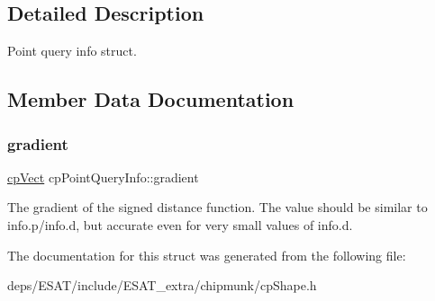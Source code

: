 \subsection{Detailed Description}
Point query info struct. 

\subsection{Member Data Documentation}
\mbox{\label{structcp_point_query_info_a55bf2732bc2563af6c83ce1985906034}} 
\subsubsection{\texorpdfstring{gradient}{gradient}}
{\footnotesize\ttfamily \mbox{\hyperlink{structcp_vect}{cp\+Vect}} cp\+Point\+Query\+Info\+::gradient}

The gradient of the signed distance function. The value should be similar to info.\+p/info.d, but accurate even for very small values of info.\+d. 

The documentation for this struct was generated from the following file\+:\begin{DoxyCompactItemize}
\item 
deps/\+E\+S\+A\+T/include/\+E\+S\+A\+T\+\_\+extra/chipmunk/cp\+Shape.\+h\end{DoxyCompactItemize}
